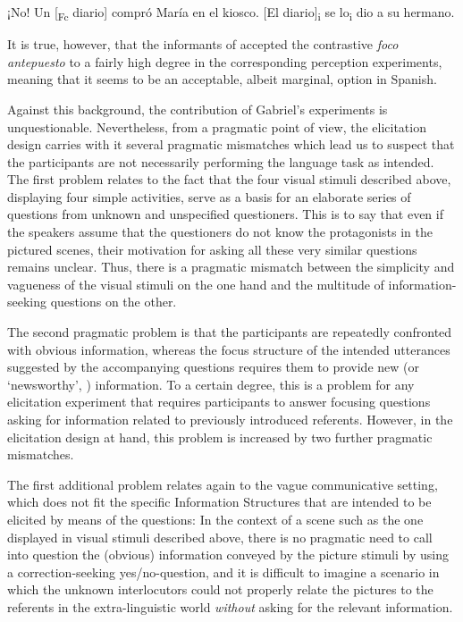 \documentclass[output=paper]{langsci/langscibook}
\begin{document}
\ea%
    \label{ex:uth:2}
    \ea   ¡No! Un [\textsubscript{Fc} diario] compró María en el kiosco.
    \ex{}   [El diario]\textsubscript{i} se lo\textsubscript{i} dio a su hermano. \citep[285]{Gabriel2007}
\z
\z

It is true, however, that the informants of \citet{Gabriel2007} accepted the contrastive \textit{foco antepuesto} to a fairly high degree in the corresponding perception experiments, meaning that it seems to be an acceptable, albeit marginal, option in Spanish.

Against this background, the contribution of Gabriel's \citeyearpar{Gabriel2007} experiments is unquestionable. Nevertheless, from a pragmatic point of view, the elicitation design carries with it several pragmatic mismatches which lead us to suspect that the participants are not necessarily performing the language task as intended. The first problem relates to the fact that the four visual stimuli described above, displaying four simple activities, serve as a basis for an elaborate series of questions from unknown and unspecified questioners. This is to say that even if the speakers assume that the questioners do not know the protagonists in the pictured scenes, their motivation for asking all these very similar questions remains unclear. Thus, there is a pragmatic mismatch between the simplicity and vagueness of the visual stimuli on the one hand and the multitude of information-seeking questions on the other. 

The second pragmatic problem is that the participants are repeatedly confronted with obvious information, whereas the focus structure of the intended utterances suggested by the accompanying questions requires them to provide new (or ‘newsworthy’, \citealt{Baumann2006}) information. To a certain degree, this is a problem for any elicitation experiment that requires participants to answer focusing questions asking for information related to previously introduced referents. However, in the elicitation design at hand, this problem is increased by two further pragmatic mismatches. 

The first additional problem relates again to the vague communicative setting, which does not fit the specific Information Structures that are intended to be elicited by means of the questions: In the context of a scene such as the one displayed in visual stimuli described above, there is no pragmatic need to call into question the (obvious) information conveyed by the picture stimuli by using a correction-seeking yes/no-question, and it is difficult to imagine a scenario in which the unknown interlocutors could not properly relate the pictures to the referents in the extra-linguistic world \textit{without} asking for the relevant information.
\end{document}
